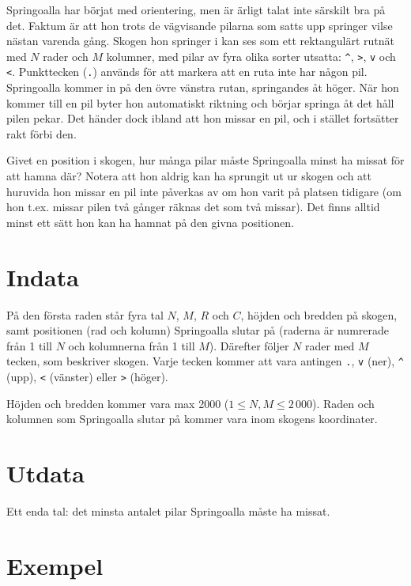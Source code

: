 
Springoalla har börjat med orientering, men är ärligt talat inte
särskilt bra på det. Faktum är att hon trots de vägvisande pilarna
som satts upp springer vilse nästan varenda gång. Skogen hon springer
i kan ses som ett rektangulärt rutnät med $N$ rader och $M$ kolumner,
med pilar av fyra olika sorter utsatta: \texttt{\^}, \texttt{>},
\texttt{v} och \texttt{<}.
Punkttecken (\texttt{.}) används för att markera att en ruta inte har någon
pil. Springoalla
kommer in på den övre vänstra rutan, springandes åt höger. När hon
kommer till en pil byter hon automatiskt riktning och börjar springa
åt det håll pilen pekar. Det händer dock ibland att hon missar en
pil, och i stället fortsätter rakt förbi den.

Givet en position i skogen, hur många pilar måste Springoalla minst ha
missat för att hamna där? Notera att hon aldrig kan ha sprungit ut ur
skogen och att huruvida hon missar en pil inte påverkas av om hon varit
på platsen tidigare (om hon t.ex. missar pilen två gånger räknas det
som två missar). Det finns alltid minst ett sätt hon kan ha hamnat på den givna positionen.

\section*{Indata}

På den första raden står fyra tal $N$, $M$, $R$ och $C$, höjden och
bredden på skogen, samt positionen (rad och kolumn) Springoalla slutar
på (raderna är numrerade från 1 till $N$ och kolumnerna från 1 till
$M$). Därefter följer $N$ rader med $M$ tecken, som beskriver skogen.
Varje tecken kommer att vara antingen \texttt{.}, \texttt{v} (ner),
\texttt{\^} (upp), \texttt{<} (vänster) eller \texttt{>} (höger).

Höjden och bredden kommer vara max 2000 ($1 \leq N,M \leq 2\,000$). Raden och kolumnen som
Springoalla slutar på kommer vara inom skogens koordinater.

\section*{Utdata}

Ett enda tal: det minsta antalet pilar Springoalla måste ha missat.

\section*{Exempel}

